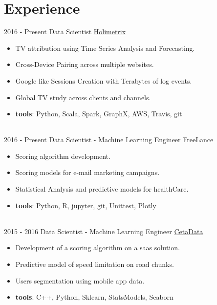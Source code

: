 \documentclass[letterpaper]{twentysecondcv} %
\begin{document}
\makeprofile %



\section{Experience}{\faAlignJustify}

\begin{twenty} %
\twentyitem
    	{2016 -}
		{Present}
        {Data Scientist}
        {\href{http://www.holimetrix.ccom/}{Holimetrix}}
        {}
        {
				\begin{itemize}
				\item TV attribution using Time Series Analysis and Forecasting. 
				\item Cross-Device Pairing across multiple websites.
				\item Google like Sessions Creation with Terabytes of log events.
				\item Global TV study across clients and channels.
				\item \textbf{tools}: Python, Scala, Spark, GraphX, AWS, Travis, git
				\end{itemize}} \\
				
	\twentyitem
    	{2016 -}
		{Present}
        {Data Scientist - Machine Learning Engineer}
        {FreeLance}
        {}
        {\begin{itemize}
        \item Scoring algorithm development.
        \item Scoring models for e-mail marketing campaigns. 
        \item Statistical Analysis and predictive models for healthCare. 
				\item \textbf{tools}: Python, R, jupyter, git, Unittest, Plotly
    \end{itemize}}\\
		
    \twentyitem
   		{2015 - 2016}
		{}
        {Data Scientist - Machine Learning Engineer}
        {\href{http://www.cetadata.com/}{CetaData}}
        {}
        {\begin{itemize}
				\item Development of a scoring algorithm on a saas solution.
        \item Predictive model of speed limitation on road chunks.
				\item Users segmentation using mobile app data.
				\item \textbf{tools}: C++, Python, Sklearn, StatsModels, Seaborn
    \end{itemize}} \\
		

\end{twenty}
\end{document}
